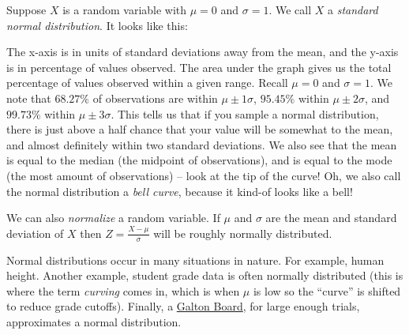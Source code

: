 \documentclass[main.tex]{subfiles}
\begin{document}
\begin{example}
	Suppose \(X\) is a random variable with \(\mu = 0\) and \(\sigma = 1\). We call \(X\) a \textit{standard normal distribution}. It looks like this:
	\medskip
	\begin{center}
	\end{center}
	
	The x-axis is in units of standard deviations away from the mean, and the y-axis is in percentage of values observed. The area under the graph gives us the total percentage of values observed within a given range. Recall \(\mu=0\) and \(\sigma=1\). We note that \(68.27\%\) of observations are within \(\mu \pm 1\sigma\), \(95.45\%\) within \(\mu \pm 2\sigma\), and \(99.73\%\) within \(\mu \pm 3\sigma\). This tells us that if you sample a normal distribution, there is just above a half chance that your value will be somewhat to the mean, and almost definitely within two standard deviations. We also see that the mean is equal to the median (the midpoint of observations), and is equal to the mode (the most amount of observations) -- look at the tip of the curve! Oh, we also call the normal distribution a \textit{bell curve}, because it kind-of looks like a bell!
	
	We can also \textit{normalize} a random variable. If \(\mu\) and \(\sigma\) are the mean and standard deviation of \(X\) then \(Z = \frac{X - \mu}{\sigma}\) will be roughly normally distributed.
	
	Normal distributions occur in many situations in nature. For example, human height. Another example, student grade data is often normally distributed (this is where the term \textit{curving} comes in, which is when \(\mu\) is low so the ``curve'' is shifted to reduce grade cutoffs). Finally, a \href{https://mathworld.wolfram.com/GaltonBoard.html}{Galton Board}, for large enough trials, approximates a normal distribution.
\end{example}
\end{document}
